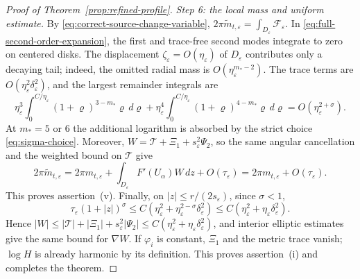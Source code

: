 \documentclass[10pt,a4paper]{amsart}
\numberwithin{equation}{section}
\theoremstyle{definition}
\theoremstyle{remark}
\newcommand{\eps}{\varepsilon}
\newcommand{\etae}{\eta_{\eps}}
\newcommand{\de}{\delta_{\eps}}
\begin{document}
\begin{proof}[Proof of Theorem~\ref{prop:refined-profile}]
\medskip\noindent
\emph{Step 6: the local mass and uniform estimate.}
By \eqref{eq:correct-source-change-variable},
$2\pi\widetilde m_{t,\eps}=\int_{D_\eps}\mathcal F_\eps$.
In \eqref{eq:full-second-order-expansion}, the first and trace-free
second modes integrate to zero on centered disks. The displacement
$\zeta_\eps=O(\etae)$ of $D_\eps$ contributes only a decaying tail;
indeed, the omitted radial mass is $O(\etae^{m_*-2})$.
The trace terms are $O(\etae^2\de^2)$, and the largest remainder
integrals are
\[
 \etae^3\int_0^{C/\etae}(1+\varrho)^{3-m_*}\varrho\,d\varrho
 +\etae^4\int_0^{C/\etae}(1+\varrho)^{4-m_*}\varrho\,d\varrho
 =O(\etae^{2+\sigma}).
\]
At $m_*=5$ or $6$ the additional logarithm is absorbed by the strict
choice \eqref{eq:sigma-choice}. Moreover,
$W=\mathcal T+\Xi_1+s_\eps^2\Psi_2$, so the same angular cancellation
and the weighted bound on $\mathcal T$ give
\[
 2\pi\widetilde m_{t,\eps}
 =2\pi m_{t,\eps}+\int_{D_\eps}F'(U_\alpha)W\,dz+O(\tau_\eps)
 =2\pi m_{t,\eps}+O(\tau_\eps).
\]
This proves assertion~(v).
Finally, on $|z|\le r/(2s_\eps)$, since $\sigma<1$,
\[
 \tau_\eps(1+|z|)^\sigma
 \le C(\etae^2+\etae^{2-\sigma}\de^2)
 \le C(\etae^2+\etae\de^2).
\]
Hence $|W|\le|\mathcal T|+|\Xi_1|+s_\eps^2|\Psi_2|
\le C(\etae^2+\etae\de^2)$, and interior elliptic estimates give
the same bound for $\nabla W$.
If $\varphi_i$ is constant, $\Xi_1$ and the metric trace vanish;
$\log H$ is already harmonic by its definition. This proves assertion~(i) and
completes the theorem.
\end{proof}
\end{document}
